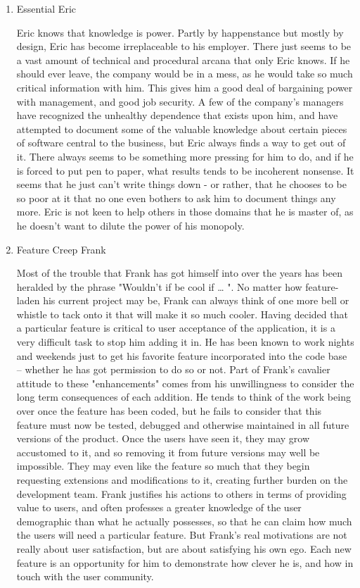 \documentclass{article}
\begin{document}
\begin{enumerate}
\item Essential Eric
\label{sec:orgheadline8}

Eric knows that knowledge is power. Partly by happenstance but mostly by
design, Eric has become irreplaceable to his employer. There just seems
to be a vast amount of technical and procedural arcana that only Eric
knows. If he should ever leave, the company would be in a mess, as he
would take so much critical information with him. This gives him a good
deal of bargaining power with management, and good job security. A few
of the company's managers have recognized the unhealthy dependence that
exists upon him, and have attempted to document some of the valuable
knowledge about certain pieces of software central to the business, but
Eric always finds a way to get out of it. There always seems to be
something more pressing for him to do, and if he is forced to put pen to
paper, what results tends to be incoherent nonsense. It seems that he
just can't write things down - or rather, that he chooses to be so poor
at it that no one even bothers to ask him to document things any more.
Eric is not keen to help others in those domains that he is master of,
as he doesn't want to dilute the power of his monopoly.

\item Feature Creep Frank
\label{sec:orgheadline9}

Most of the trouble that Frank has got himself into over the years has
been heralded by the phrase "Wouldn't if be cool if \ldots{} ". No matter how
feature-laden his current project may be, Frank can always think of one
more bell or whistle to tack onto it that will make it so much cooler.
Having decided that a particular feature is critical to user acceptance
of the application, it is a very difficult task to stop him adding it
in. He has been known to work nights and weekends just to get his
favorite feature incorporated into the code base -- whether he has got
permission to do so or not. Part of Frank's cavalier attitude to these
"enhancements" comes from his unwillingness to consider the long term
consequences of each addition. He tends to think of the work being over
once the feature has been coded, but he fails to consider that this
feature must now be tested, debugged and otherwise maintained in all
future versions of the product. Once the users have seen it, they may
grow accustomed to it, and so removing it from future versions may well
be impossible. They may even like the feature so much that they begin
requesting extensions and modifications to it, creating further burden
on the development team. Frank justifies his actions to others in terms
of providing value to users, and often professes a greater knowledge of
the user demographic than what he actually possesses, so that he can
claim how much the users will need a particular feature. But Frank's
real motivations are not really about user satisfaction, but are about
satisfying his own ego. Each new feature is an opportunity for him to
demonstrate how clever he is, and how in touch with the user community.


\end{enumerate}
\end{document}

